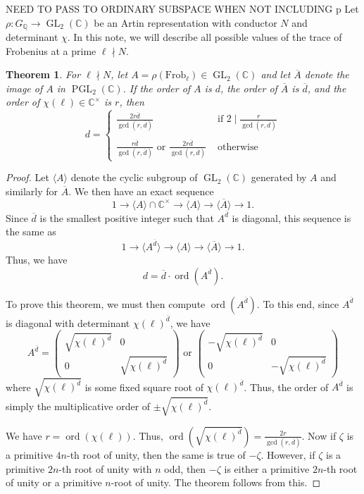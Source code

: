\documentclass[11pt]{amsart}
\theoremstyle{plain}
\newtheorem{thm}{Theorem}[section]
\theoremstyle{definition}
\newcommand{\Q}{{\mathbb Q}}
\newcommand{\C}{{\mathbb C}}
\DeclareMathOperator{\ord}{ord}
\DeclareMathOperator{\PGL}{PGL}
\DeclareMathOperator{\GL}{GL}
\newcommand{\Frob}{\text{Frob}}
\renewcommand{\[}{\left[}
\renewcommand{\]}{\right]}
\newcommand{\dbar}{\overline{d}}
\begin{document}
NEED TO PASS TO ORDINARY SUBSPACE WHEN NOT INCLUDING p
\vfill
\pagebreak
Let $\rho : G_{\Q} \to \GL_2(\C)$ be an Artin representation with conductor $N$ and determinant $\chi$.  In this note, we will describe all possible values of the trace of Frobenius at a prime $\ell \nmid N$.  

\begin{thm}
For $\ell \nmid N$, let $A = \rho(\Frob_\ell) \in \GL_2(\C)$ and let $\overline{A}$ denote the image of $A$ in $\PGL_2(\C)$.  If the order of $A$ is $d$, the order of $\overline{A}$ is $\overline{d}$, and the order of $\chi(\ell) \in \C^\times$ is $r$, then 
$$
d = \begin{cases}
\frac{2 r \dbar}{\gcd(r,\dbar)} & \text{~if~} 2 \mid \frac{r}{\gcd(r,\dbar)} \\ 
~\\
\frac{r \dbar}{\gcd(r,\dbar)} \text{~or~} \frac{2 r \dbar}{\gcd(r,\dbar)} & \text{~otherwise}
\end{cases}
$$
\end{thm}

\begin{proof}
Let $\langle A \rangle$ denote the cyclic subgroup of $\GL_2(\C)$ generated by $A$ and similarly for $\overline{A}$.  
We then have an exact sequence
$$
1 \to \langle A \rangle \cap \C^\times \to \langle A \rangle \to \langle \overline{A} \rangle \to 1.
$$
Since $\dbar$ is the smallest positive integer such that $A^{\dbar}$ is diagonal, this sequence is the same as 
$$
1 \to \langle A^{\dbar} \rangle  \to \langle A \rangle \to \langle \overline{A} \rangle \to 1.
$$
Thus, we have
$$
d = \dbar \cdot \ord(A^{\dbar}).
$$


To prove this theorem, we must then compute $\ord(A^{\dbar})$.  To this end, since $A^{\dbar}$ is diagonal with determinant $\chi(\ell)^{\dbar}$, we have
$$
A^{\dbar} = 
\begin{pmatrix}   \sqrt{\chi(\ell)^{\dbar}} & 0 \\ 0 & \sqrt{\chi(\ell)^{\dbar}} \end{pmatrix}
\text{~or~}
\begin{pmatrix}   -\sqrt{\chi(\ell)^{\dbar}} & 0 \\ 0 & -\sqrt{\chi(\ell)^{\dbar}} \end{pmatrix}
$$
where $\sqrt{\chi(\ell)^{\dbar}}$ is some fixed square root of ${\chi(\ell)^{\dbar}}$.
Thus, the order of $A^{\dbar}$ is simply the multiplicative order of $\pm  \sqrt{\chi(\ell)^{\dbar}}$.

We have $r = \ord(\chi(\ell))$.  Thus, $\ord(\sqrt{\chi(\ell)^{\dbar}}) = \displaystyle \frac{2r}{\gcd(r,\dbar)}$.  Now if $\zeta$ is a primitive $4n$-th root of unity, then the same is true of $-\zeta$.  However, if $\zeta$ is a primitive $2n$-th root of unity with $n$ odd, then $-\zeta$ is either a primitive $2n$-th root of unity or a primitive $n$-root of unity.  The theorem follows from this.
\end{proof}
\end{document}
